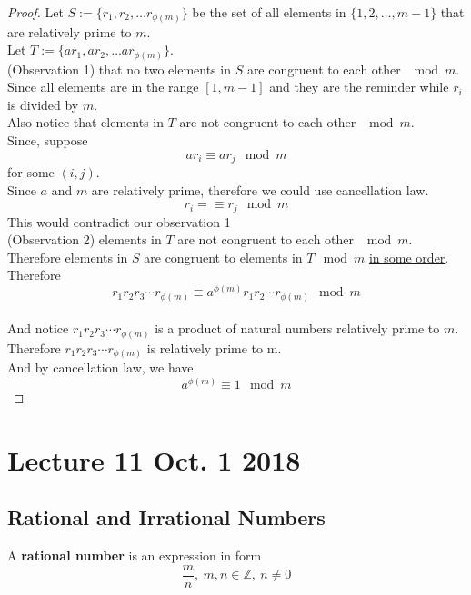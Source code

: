 \documentclass[10pt]{article}
\begin{document}
	\begin{proof}\renewcommand{\qedsymbol}{\textcolor{red}{$ \ensuremath\varheartsuit$}}
		Let $S := \{r_1, r_2, \dots r_{\phi(m)}\}$ be the set of all elements in $\{1, 2, \dots, m-1\}$ that are relatively prime to $m$. \\
		Let $T := \{a r_1, a r_2, \dots a r_{\phi(m)}\}$. \\
		(Observation 1) that no two elements in $S$ are congruent to each other $\mod m$. Since all elements are in the range $[1, m-1]$ and they are the reminder while $r_i$ is divided by $m$. \\
		Also notice that elements in $T$ are not congruent to each other $\mod m$.\\
		Since, suppose \[a r_i \equiv a r_j \mod m\] for some $(i, j)$. \\
		Since $a$ and $m$ are relatively prime, therefore we could use cancellation law.\\
		\[
			r_i =\equiv r_j \mod m
		\]
		This would contradict our observation 1 \\
		(Observation 2) elements in $T$ are not congruent to each other $\mod m$. \\
		Therefore elements in $S$ are congruent to elements in $T \mod m$ \ul{in some order}. \\
		Therefore \[ r_1 r_2 r_3 \cdots r_{\phi(m)} \equiv a^{\phi(m)} r_1 r_2 \cdots r_{\phi(m)} \mod m \]\\
		 And notice $r_1 r_2 r_3 \cdots r_{\phi(m)}$ is a product of natural numbers relatively prime to $m$. \\
		 Therefore $r_1 r_2 r_3 \cdots r_{\phi(m)}$ is relatively prime to m. \\
		 And by cancellation law, we have 
		 \[
		 	a^{\phi(m)} \equiv 1 \mod m
		 \]
	\end{proof}
	
	\section{Lecture 11 Oct. 1 2018}
	\subsection{Rational and Irrational Numbers}
	\begin{definition}
		A \textbf{rational number} is an expression in form 
		\[
			\frac{m}{n},\ m,n \in \mathbb{Z},\ n \neq 0
		\]
	\end{definition}
	
\end{document}
